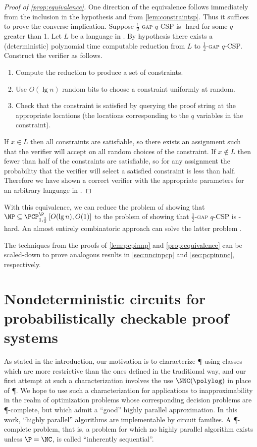 \documentclass[]{article}
\newcommand{\PCPcs}[5]{\PCP^{#1}_{#2, #3}\left[#4, #5\right]}
\begin{document}
\begin{proof}[Proof of \autoref{prop:equivalence}]
  One direction of the equivalence follows immediately from the inclusion in the hypothesis and from \autoref{lem:constraintsp}.
  Thus it suffices to prove the converse implication.
  Suppose \textsc{$\frac{1}{2}$-gap $q$-CSP} is \NP-hard for some $q$ greater than 1.
  Let $L$ be a language in \NP.
  By hypothesis there exists a (deterministic) polynomial time computable reduction from $L$ to \textsc{$\frac{1}{2}$-gap $q$-CSP}.
  Construct the \PCP{} verifier as follows.
  \begin{enumerate}
  \item Compute the reduction to produce a set of constraints.
  \item Use $O(\lg n)$ random bits to choose a constraint uniformly at random.
  \item Check that the constraint is satisfied by querying the proof string at the appropriate locations (the locations corresponding to the $q$ variables in the constraint).
  \end{enumerate}

  If $x \in L$ then all constraints are satisfiable, so there exists an assignment such that the verifier will accept on all random choices of the constraint.
  If $x \notin L$ then fewer than half of the constraints are satisfiable, so for any assignment the probability that the verifier will select a satisfied constraint is less than half.
  Therefore we have shown a correct \PCP{} verifier with the appropriate parameters for an arbitrary language in \NP.
\end{proof}
With this equivalence, we can reduce the problem of showing that $\NP \subseteq \PCPcs{\P}{1}{\frac{1}{2}}{O(\lg n)}{O(1)}$ to the problem of showing that \textsc{$\frac{1}{2}$-gap $q$-CSP} is \NP-hard.
An almost entirely combinatoric approach can solve the latter problem \cite{dinur07}.

The techniques from the proofs of \autoref{lem:pcpinnp} and \autoref{prop:equivalence} can be scaled-down to prove analogous results in \autoref{sec:nncinpcp} and \autoref{sec:pcpinnnc}, respectively.

\section{Nondeterministic \texorpdfstring{\NC}{NC} circuits for probabilistically checkable proof systems}\label{sec:nncinpcp}

As stated in the introduction, our motivation is to characterize \P{} using \PCP{} classes which are more restrictive than the ones defined in the traditional way, and our first attempt at such a characterization involves the use $\NNC(\polylog)$ in place of \P.
We hope to use such a characterization for applications to inapproximability in the realm of optimization problems whose corresponding decision problems are \P-complete, but which admit a ``good'' highly parallel approximation.
In this work, ``highly parallel'' algorithms are implementable by \NC{} circuit families.
A \P-complete problem, that is, a problem for which no highly parallel algorithm exists unless $\P = \NC$, is called ``inherently sequential''.
\end{document}
